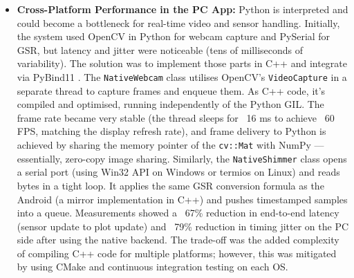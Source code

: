 \begin{itemize}
    \item \textbf{Cross-Platform Performance in the PC App:} Python is interpreted and could become a bottleneck for real-time video and sensor handling. Initially, the system used OpenCV \cite{ref22} in Python for webcam capture and PySerial for GSR, but latency and jitter were noticeable (tens of milliseconds of variability). The solution was to implement those parts in C++ and integrate via PyBind11 \cite{ref18}. The \texttt{NativeWebcam} class utilises OpenCV's \cite{ref22} \texttt{VideoCapture} in a separate thread to capture frames and enqueue them. As C++ code, it's compiled and optimised, running independently of the Python GIL. The frame rate became very stable (the thread sleeps for ~16 ms to achieve ~60 FPS, matching the display refresh rate), and frame delivery to Python is achieved by sharing the memory pointer of the \texttt{cv::Mat} with NumPy — essentially, zero-copy image sharing. Similarly, the \texttt{NativeShimmer} class opens a serial port (using Win32 API on Windows or termios on Linux) and reads bytes in a tight loop. It applies the same GSR conversion formula as the Android (a mirror implementation in C++) and pushes timestamped samples into a queue. Measurements showed a ~67\% reduction in end-to-end latency (sensor update to plot update) and ~79\% reduction in timing jitter on the PC side after using the native backend. The trade-off was the added complexity of compiling C++ code for multiple platforms; however, this was mitigated by using CMake and continuous integration testing on each OS.

\end{itemize}
